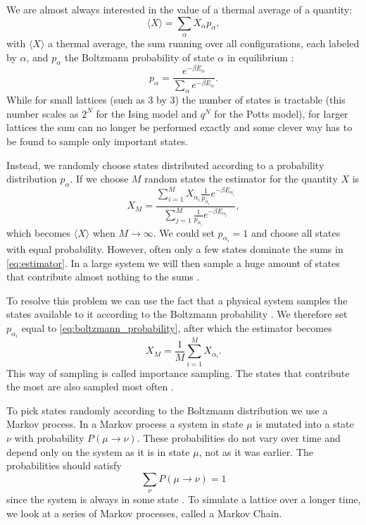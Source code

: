 \documentclass[11pt, a4paper]{report} %
\begin{document}
We are almost always interested in the value of a thermal average of a quantity:
\begin{equation}
	\langle X \rangle = \sum_{\alpha}X_{\alpha}p_{\alpha},
\end{equation}
with \(\langle X \rangle\) a thermal average, the sum running over all configurations, each labeled by \(\alpha\), and \(p_{\alpha}\) the Boltzmann probability of state \(\alpha\) in equilibrium \cite{binney:1992}:
\begin{equation}\label{eq:boltzmann_probability}
	p_{\alpha} = \frac{e^{-\beta E_{\alpha}}}{\sum_{\alpha}e^{-\beta E_{\alpha}}}.
\end{equation}
While for small lattices (such as 3 by 3) the number of states is tractable (this number scales as \(2^{N}\) for the Ising model and \(q^{N}\) for the Potts model), for larger lattices the sum can no longer be performed exactly and some clever way has to be found to sample only important states.

Instead, we randomly choose states distributed according to a probability distribution \(p_{\alpha}\).
If we choose \(M\) random states the estimator for the quantity \(X\) is
\begin{equation}\label{eq:estimator}
	X_M = \frac{\sum_{i=1}^M X_{\alpha_i}\frac{1}{p_{\alpha_i}}e^{-\beta E_{\alpha_i}}}{\sum_{j=1}^M \frac{1}{p_{\alpha_i}} e^{-\beta E_{\alpha_i}}},
\end{equation}
which becomes \(\langle X \rangle\) when \(M \to \infty\).
We could set \(p_{\alpha_i}=1\) and choose all states with equal probability.
However, often only a few states dominate the sums in \cref{eq:estimator}.
In a large system we will then sample a huge amount of states that contribute almost nothing to the sums \cite{newman:1999}.

To resolve this problem we can use the fact that a physical system samples the states available to it according to the Boltzmann probability .
We therefore set \(p_{\alpha_i}\) equal to \cref{eq:boltzmann_probability}, after which the estimator becomes
\begin{equation}
	X_M = \frac{1}{M} \sum_{i=1}^M X_{\alpha_i}.
\end{equation}
This way of sampling is called importance sampling. The states that contribute the most are also sampled most often \cite{newman:1999}.

To pick states randomly according to the Boltzmann distribution we use a Markov process.
In a Markov process a system in state \(\mu\) is mutated into a state \(\nu\) with probability \(P(\mu\to\nu)\).
These probabilities do not vary over time and depend only on the system as it is in state \(\mu\), not as it was earlier.
The probabilities should satisfy
\begin{equation}
	\sum_{\nu} P(\mu \to \nu) = 1
\end{equation}
since the system is always in some state \cite{newman:1999,landau:2015}.
To simulate a lattice over a longer time, we look at a series of Markov processes, called a Markov Chain.
\end{document}
